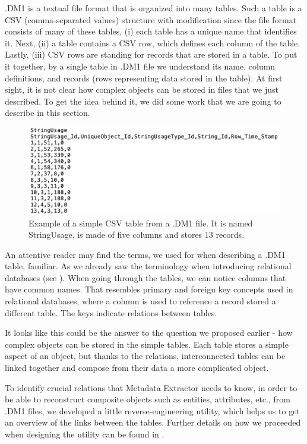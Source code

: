 .DM1 is a textual file format that is organized into many tables.
Such a table is a CSV (comma-separated values) structure with modification since the file format consists of many of these tables, (i) each table has a unique name that identifies it. 
Next, (ii) a table contains a CSV row, which defines each column of the table. 
Lastly, (iii) CSV rows are standing for records that are stored in a table. 
To put it together, by a single table in .DM1 file we understand its name, column definitions, and records (rows representing data stored in the table).
At first sight, it is not clear how complex objects can be stored in files that we just described. To get the idea behind it, we did some work that we are going to describe in this section. 

\begin{figure}[H]
	\centering
	\includegraphics[width=14cm]{../img/StringUsageTable}
	\caption[Table from .DM1 file]{Example of a simple CSV table from a .DM1 file. It is named StringUsage, is made of five columns and stores 13 records.}
\end{figure}


An attentive reader may find the terms, we used for when describing a .DM1 table, familiar. 
As we already saw the terminology when introducing relational databases (see ). 
When going through the tables, we can notice columns that have common names.
That resembles primary and foreign key concepts used in relational databases, where a column is used to reference a record stored a different table. 
The keys indicate relations between tables.

It looks like this could be the answer to the question we proposed earlier - how complex objects can be stored in the simple tables. Each table stores a simple aspect of an object, but thanks to the relations, interconnected tables can be linked together and compose from their data a more complicated object.

To identify crucial relations that Metadata Extractor needs to know, in order to be able to reconstruct composite objects such as entities, attributes, etc., from .DM1 files, we developed a little reverse-engineering utility, which helps us to get an overview of the links between the tables.
Further details on how we proceeded when designing the utility can be found in . 

